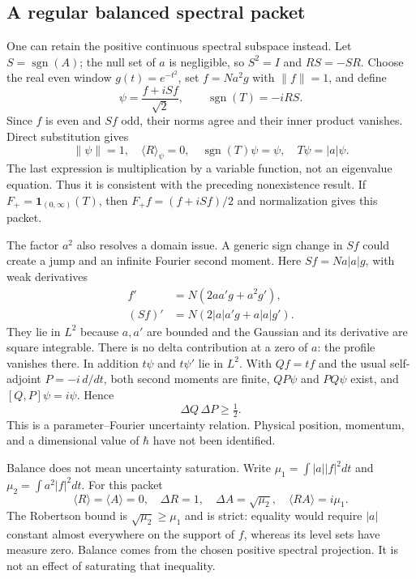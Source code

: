 \documentclass[11pt,a4paper]{article}
\begin{document}
\subsection{A regular balanced spectral packet}

One can retain the positive continuous spectral subspace instead.
Let $S=\operatorname{sgn}(A)$; the null set of $a$ is negligible,
so $S^2=I$ and $RS=-SR$. Choose the real even window
$g(t)=e^{-t^2}$, set $f=Na^2g$ with $\|f\|=1$, and define
\begin{equation}
 \psi=\frac{f+iSf}{\sqrt2},\qquad
 \operatorname{sgn}(T)=-iRS.
\end{equation}
Since $f$ is even and $Sf$ odd, their norms agree and their inner
product vanishes. Direct substitution gives
\begin{equation}
 \|\psi\|=1,\quad \langle R\rangle_\psi=0,\quad
 \operatorname{sgn}(T)\psi=\psi,\quad T\psi=|a|\psi.
\end{equation}
The last expression is multiplication by a variable function,
not an eigenvalue equation. Thus it is consistent with the preceding
nonexistence result. If $F_+=\mathbf1_{(0,\infty)}(T)$, then
$F_+f=(f+iSf)/2$ and normalization gives this packet.

The factor $a^2$ also resolves a domain issue. A generic sign change
in $Sf$ could create a jump and an infinite Fourier second moment.
Here $Sf=Na|a|g$, with weak derivatives
\begin{align}
 f'&=N(2aa'g+a^2g'),\\
 (Sf)'&=N(2|a|a'g+a|a|g').
\end{align}
They lie in $L^2$ because $a,a'$ are bounded and the Gaussian and its
derivative are square integrable. There is no delta contribution at a
zero of $a$: the profile vanishes there. In addition $t\psi$ and
$t\psi'$ lie in $L^2$. With $Qf=tf$ and the usual self-adjoint
$P=-i\,d/dt$, both second moments are finite, $QP\psi$ and
$PQ\psi$ exist, and $[Q,P]\psi=i\psi$. Hence
\begin{equation}
 \Delta Q\,\Delta P\geq\tfrac12.
\end{equation}
This is a parameter--Fourier uncertainty relation. Physical position,
momentum, and a dimensional value of $\hbar$ have not been identified.

Balance does not mean uncertainty saturation. Write
$\mu_1=\int |a||f|^2dt$ and $\mu_2=\int a^2|f|^2dt$. For this packet
\begin{equation}
 \langle R\rangle=\langle A\rangle=0,\quad
 \Delta R=1,\quad \Delta A=\sqrt{\mu_2},\quad
 \langle RA\rangle=i\mu_1.
\end{equation}
The Robertson bound is $\sqrt{\mu_2}\geq\mu_1$ and is strict:
equality would require $|a|$ constant almost everywhere on the
support of $f$, whereas its level sets have measure zero. Balance
comes from the chosen positive spectral projection. It is not an
effect of saturating that inequality.
\end{document}
